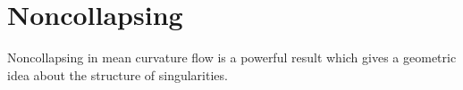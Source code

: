 \chapter{Noncollapsing}

Noncollapsing in mean curvature flow is a powerful result which gives a geometric idea about the structure of singularities. 
